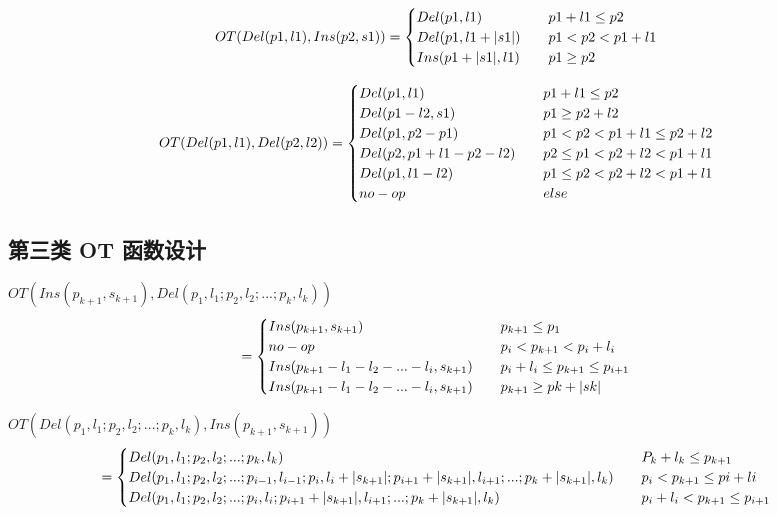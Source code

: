 \documentclass[a4paper,UTF8]{article}
\begin{document}
\begin{equation}
OT(Del(p1,l1),Ins(p2,s1))= \begin{cases}
Del(p1,l1) \quad & p1 + l1 \le p2 \\
Del(p1,l1+|s1|) \quad & p1<p2<p1+l1 \\
Ins(p1+ |s1|,l1) \quad & p1 \ge p2 \end{cases}\\
\end{equation}

\begin{equation}
OT(Del(p1,l1),Del(p2,l2))= \begin{cases}
Del(p1,l1) \quad & p1+l1 \le p2 \\
Del(p1-l2,s1) \quad & p1 \ge p2+l2 \\
Del(p1,p2-p1) \quad & p1<p2<p1+l1 \le p2+l2\\
Del(p2,p1+l1-p2-l2) \quad & p2 \le p1 <p2+l2 < p1+l1\\
Del(p1,l1-l2) \quad & p1 \le p2 <p2+l2 < p1+l1\\
no-op \quad & else \end{cases}\\
\end{equation}
\subsection{第三类 OT 函数设计}

$OT(Ins(p_{k+1},s_{k+1}),Del(p_1,l_1;p_2,l_2;...;p_k,l_k))$\\
\begin{equation}
= \begin{cases}
Ins(p_{k+1},s_{k+1}) \quad & p_{k+1} \le p_1 \\
no-op \quad & p_i<p_{k+1}<p_i+l_i\\
Ins(p_{k+1}-l_1-l_2-...-l_i,s_{k+1}) \quad & p_i+l_i \le p_{k+1} \le p_{i+1}\\
Ins(p_{k+1}-l_1-l_2-...-l_i,s_{k+1}) \quad & p_{k+1} \ge pk+|sk| \end{cases}\\
\end{equation}

$OT(Del(p_1,l_1;p_2,l_2;...;p_k,l_k),Ins(p_{k+1},s_{k+1}))$\\
\begin{equation}
= \begin{cases}
Del(p_1,l_1;p_2,l_2;...;p_k,l_k) &\quad P_k+l_k \le p_{k+1} \\
Del(p_1,l_1;p_2,l_2;...;p_{i-1},l_{i-1};p_i,l_i+|s_{k+1}|;p_{i+1}+|s_{k+1}|,l_{i+1};...;p_k+|s_{k+1}|,l_k) &\quad p_i<p_{k+1} \le pi+li \\
Del(p_1,l_1;p_2,l_2;...;p_i,l_i;p_{i+1}+|s_{k+1}|,l_{i+1};...;p_k+|s_{k+1}|,l_k) & \quad p_i+l_i < p_{k+1} \le p_{i+1}\\
 \end{cases}\\
\end{equation}
\end{document}

